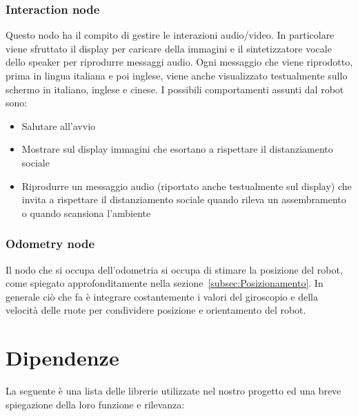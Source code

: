 \documentclass[a4paper]{article}
\begin{document}
	\subsubsection{Interaction node}\label{subsubsec:Interaction-node}
	Questo nodo ha il compito di gestire le interazioni audio/video. In particolare viene sfruttato il display per caricare della immagini e il sintetizzatore vocale dello speaker per riprodurre messaggi audio. Ogni messaggio che viene riprodotto, prima in lingua italiana e poi inglese, viene anche visualizzato testualmente sullo schermo in italiano, inglese e cinese. 
	I possibili comportamenti assunti dal robot sono:
	\begin{itemize}
	\item Salutare all'avvio
	\item Mostrare sul display immagini che esortano a rispettare il distanziamento sociale
	\item Riprodurre un messaggio audio (riportato anche testualmente sul display) che invita a rispettare il distanziamento sociale quando rileva un assembramento o quando scansiona l'ambiente
	\end{itemize}
	\subsubsection{Odometry node}\label{subsubsec:Odometry-node}
	Il nodo che si occupa dell'odometria si occupa di stimare la posizione del robot, come spiegato approfonditamente nella sezione~\ref{subsec:Posizionamento}. In generale ciò che fa è integrare costantemente i valori del giroscopio e della velocità delle ruote per condividere posizione e orientamento del robot.
	 
	
	\section{Dipendenze}\label{sec:Dipendenze} 
	La seguente è una lista delle librerie utilizzate nel nostro progetto ed una breve spiegazione della loro funzione e rilevanza:
\end{document}
